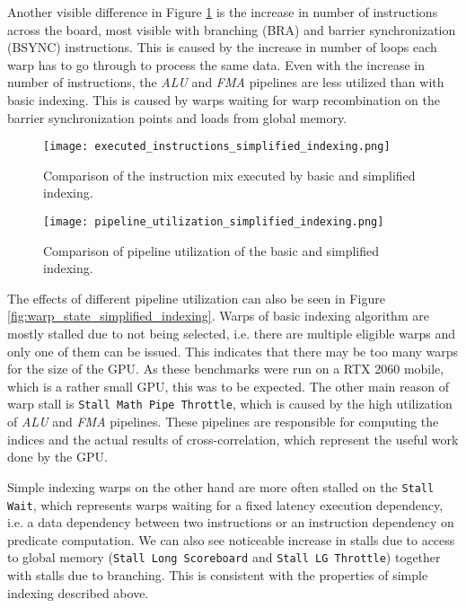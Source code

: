 Another visible difference in Figure \ref{fig:executed_instructions_simplified_indexing} is the increase in number of instructions across the board, most visible with branching (BRA) and barrier synchronization (BSYNC) instructions. This is caused by the increase in number of loops each warp has to go through to process the same data. Even with the increase in number of instructions, the \textit{ALU} and \textit{FMA} pipelines are less utilized than with basic indexing. This is caused by warps waiting for warp recombination on the barrier synchronization points and loads from global memory.

\begin{figure}[ht]
	\centering
	\texttt{[image: executed\_instructions\_simplified\_indexing.png]}
	\caption{Comparison of the instruction mix executed by basic and simplified indexing.}
	\label{fig:executed_instructions_simplified_indexing}
\end{figure}

\begin{figure}[ht]
	\centering
	\texttt{[image: pipeline\_utilization\_simplified\_indexing.png]}
	\caption{Comparison of pipeline utilization of the basic and simplified indexing.}
	\label{fig:pipeline_utilization_simplified_indexing}
\end{figure}

The effects of different pipeline utilization can also be seen in Figure \ref{fig:warp_state_simplified_indexing}. Warps of basic indexing algorithm are mostly stalled due to not being selected, i.e. there are multiple eligible warps and only one of them can be issued. This indicates that there may be too many warps for the size of the GPU. As these benchmarks were run on a RTX 2060 mobile, which is a rather small GPU, this was to be expected. The other main reason of warp stall is \texttt{Stall Math Pipe Throttle}, which is caused by the high utilization of \textit{ALU} and \textit{FMA} pipelines. These pipelines are responsible for computing the indices and the actual results of cross-correlation, which represent the useful work done by the GPU.

Simple indexing warps on the other hand are more often stalled on the \texttt{Stall Wait}, which represents warps waiting for a fixed latency execution dependency, i.e. a data dependency between two instructions or an instruction dependency on predicate computation. We can also see noticeable increase in stalls due to access to global memory (\texttt{Stall Long Scoreboard} and \texttt{Stall LG Throttle}) together with stalls due to branching. This is consistent with the properties of simple indexing described above.

